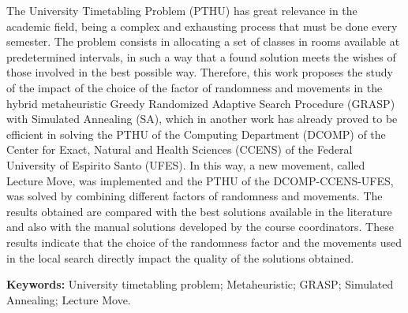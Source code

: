 \documentclass[
	12pt,				%
	openright,			%
	oneside,			%
	a4paper,			%
	english,			%
	french,				%
	spanish,			%
	brazil				%
	]{abntex2}
\newcommand{\listalgorithmname}{Lista de Algoritimos}
\renewcommand{\listalgorithmname}{Lista de Algoritimos}
\begin{document}
\setlength{\absparsep}{18pt}
\begin{resumo}[Abstract]

The University Timetabling Problem (PTHU) has great relevance in the academic field, being a complex and exhausting process that must be done every semester. The problem consists in allocating a set of classes in rooms available at predetermined intervals, in such a way that a found solution meets the wishes of those involved in the best possible way. Therefore, this work proposes the study of the impact of the choice of the factor of randomness and movements in the hybrid metaheuristic Greedy Randomized Adaptive Search Procedure (GRASP) with Simulated Annealing (SA), which in another work has already proved to be efficient in solving the PTHU of the Computing Department (DCOMP) of the Center for Exact, Natural and Health Sciences (CCENS) of the Federal University of Espirito Santo (UFES). In this way, a new movement, called Lecture Move, was implemented and the PTHU of the DCOMP-CCENS-UFES, was solved by combining different factors of randomness and movements. The results obtained are compared with the best solutions available in the literature and also with the manual solutions developed by the course coordinators. These results indicate that the choice of the randomness factor and the movements used in the local search directly impact the quality of the solutions obtained.

\textbf{Keywords:} University timetabling problem; Metaheuristic; GRASP; Simulated Annealing; Lecture Move.
\end{resumo}


\listoffigures*
\cleardoublepage

\listoftables*
\cleardoublepage

\pdfbookmark[0]{\listalgorithmname}{loa}
\listofalgorithms
\cleardoublepage
\end{document}
